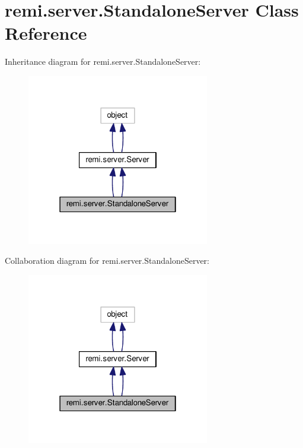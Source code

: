 \hypertarget{classremi_1_1server_1_1StandaloneServer}{}\section{remi.\+server.\+Standalone\+Server Class Reference}
\label{classremi_1_1server_1_1StandaloneServer}


Inheritance diagram for remi.\+server.\+Standalone\+Server\+:
\nopagebreak
\begin{figure}[H]
\begin{center}
\leavevmode
\includegraphics[width=226pt]{d0/daa/classremi_1_1server_1_1StandaloneServer__inherit__graph}
\end{center}
\end{figure}


Collaboration diagram for remi.\+server.\+Standalone\+Server\+:
\nopagebreak
\begin{figure}[H]
\begin{center}
\leavevmode
\includegraphics[width=226pt]{d9/d73/classremi_1_1server_1_1StandaloneServer__coll__graph}
\end{center}
\end{figure}
